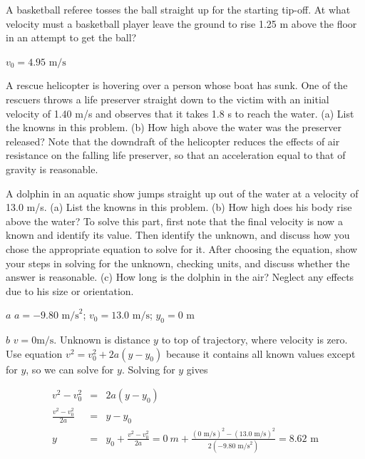 \documentclass[
]{book}
\begin{document}
\hypertarget{fs-id1781525}{}
\leavevmode{}%
A basketball referee tosses the ball straight up for the starting
tip-off. At what velocity must a basketball player leave the ground to
rise 1.25 m above the floor in an attempt to get the ball?

\leavevmode{}%
\({{v_{0} = 4}\text{.}\text{95\ m/s}}{}\)

\hypertarget{fs-id1582773}{}
\leavevmode{}%
A rescue helicopter is hovering over a person whose boat has sunk. One
of the rescuers throws a life preserver straight down to the victim with
an initial velocity of 1.40 m/s and observes that it takes 1.8 s to
reach the water. (a) List the knowns in this problem. (b) How high above
the water was the preserver released? Note that the downdraft of the
helicopter reduces the effects of air resistance on the falling life
preserver, so that an acceleration equal to that of gravity is
reasonable.

\hypertarget{fs-id1788413}{}
\leavevmode{}%
A dolphin in an aquatic show jumps straight up out of the water at a
velocity of 13.0 m/s. (a) List the knowns in this problem. (b) How high
does his body rise above the water? To solve this part, first note that
the final velocity is now a known and identify its value. Then identify
the unknown, and discuss how you chose the appropriate equation to solve
for it. After choosing the equation, show your steps in solving for the
unknown, checking units, and discuss whether the answer is reasonable.
(c) How long is the dolphin in the air? Neglect any effects due to his
size or orientation.

\leavevmode{}%
\(a\) \({{a = {- 9}}\text{.}\text{80\ m/s}^{2}}{}\);
\({{v_{0} = \text{13}}\text{.}\text{0\ m/s}}{}\);
\({y_{0} = \text{0\ m}}{}\)

\(b\) \({{v = 0}\text{m/s}}{}\). Unknown is distance \(y{}\) to top of
trajectory, where velocity is zero. Use equation
\({{v^{2} = {v_{0}^{2} + 2a}}\left( {y - y_{0}} \right)}{}\) because it
contains all known values except for \(y{}\), so we can solve for \(y{}\).
Solving for \(y{}\) gives

\leavevmode{}%
\[\begin{array}{lll}
{v^{2} - v_{0}^{2}} & = & {2a\left( {y - y_{0}} \right)} \\
\frac{v^{2} - v_{0}^{2}}{2a} & = & {y - y_{0}} \\
y & = & {{{{y_{0} + \frac{v^{2} - v_{0}^{2}}{2a}} = 0\ m + \frac{\left( \text{0\ m/s} \right)^{2} - \left( \text{13.0\ m/s} \right)^{2}}{2\left( {- \text{9.80\ m}\text{/s}^{2}} \right)}} =}\text{8.62\ m}} \\
\end{array}\]
\end{document}
